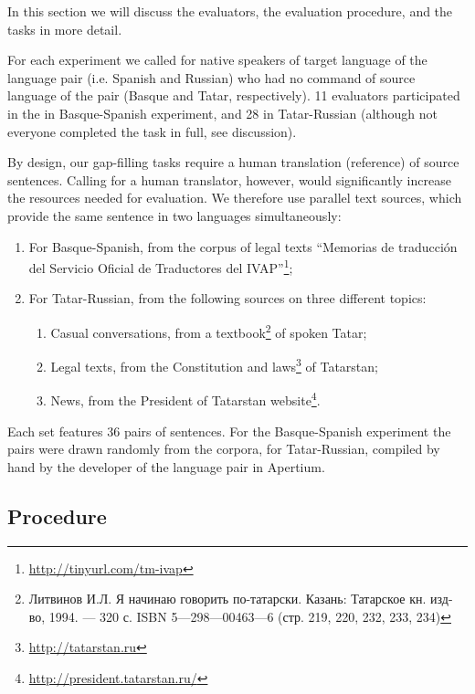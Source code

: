 \documentclass[11pt]{article}
\newcommand{\comment}[1]{\marginpar{\scriptsize\sf \textcolor{blue}{#1}}}
\newcommand{\rus}[1]{\foreignlanguage{russian}{#1}}
\begin{document}
In this section we will discuss the evaluators, the evaluation procedure, and the tasks in more detail.

For each experiment we called for native speakers of target language of the language pair (i.e.
Spanish and Russian) who had no command of source language of the pair (Basque
and Tatar, respectively). 11 evaluators participated in the in Basque-Spanish experiment, and 28 in Tatar-Russian (although not everyone completed the task
in full, see discussion).

\comment{EA: maybe I should put this into the previous section?}
By design, our gap-filling tasks require a human translation (reference) of source sentences. Calling for a human translator, however, would significantly increase the resources needed for evaluation. We therefore use parallel text sources, which provide the same sentence in two languages simultaneously:
\begin{enumerate}
\item  For Basque-Spanish, from the corpus of legal texts ``Memorias de traducci\'on del
Servicio Oficial de Traductores del IVAP''\footnote{\url{http://tinyurl.com/tm-ivap}};
\item  For Tatar-Russian, from the following sources on three different topics:
  \begin{enumerate}
    \item  Casual conversations, from a textbook\footnote{\rus{Литвинов И.Л. Я начинаю говорить по-татарски. Казань: Татарское кн. изд-во, 1994. — 320 с. ISBN 5—298—00463—6 (стр. 219, 220, 232, 233, 234)}} of spoken Tatar;
    \item  Legal texts, from the Constitution and laws\footnote{\url{http://tatarstan.ru}} of Tatarstan;
    \item  News, from the President of Tatarstan website\footnote{\url{http://president.tatarstan.ru/}}.
  \end{enumerate}
\end{enumerate}

Each set features 36 pairs of sentences. For the Basque-Spanish experiment the pairs were drawn
randomly from the corpora, for Tatar-Russian, compiled by hand by the developer of the
language pair in Apertium.

\subsection{Procedure}
\end{document}
